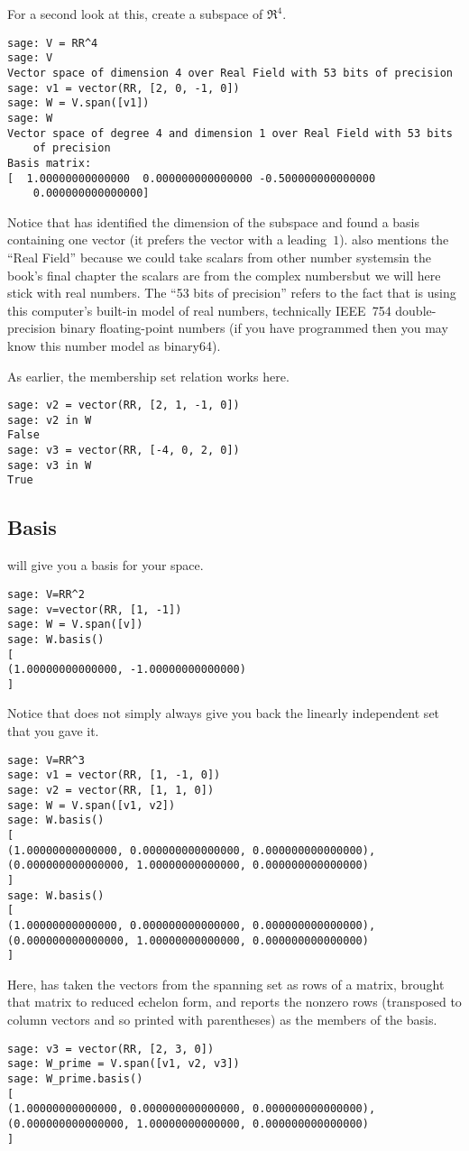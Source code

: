 For a second look at this, create a subspace of $\Re^4$.
\begin{lstlisting}
sage: V = RR^4
sage: V
Vector space of dimension 4 over Real Field with 53 bits of precision
sage: v1 = vector(RR, [2, 0, -1, 0])
sage: W = V.span([v1])
sage: W
Vector space of degree 4 and dimension 1 over Real Field with 53 bits 
    of precision
Basis matrix:
[  1.00000000000000  0.000000000000000 -0.500000000000000  
    0.000000000000000]
\end{lstlisting}
Notice that \Sage{} has identified the dimension of the subspace and found
a basis containing one vector (it prefers the vector with a leading~$1$).
\Sage{} also mentions the ``Real Field'' because we could take scalars
from other number systems\Dash in the book's final chapter the scalars are
from the complex numbers\Dash but we will here stick with real numbers.
The ``53 bits of precision'' refers to the fact that \Sage{} is using
this computer's built-in model of real numbers, technically 
IEEE~754 double-precision binary floating-point numbers 
(if you have programmed then you may know this number model as binary64).  

As earlier, the membership set relation works here.
\begin{lstlisting}
sage: v2 = vector(RR, [2, 1, -1, 0])
sage: v2 in W
False
sage: v3 = vector(RR, [-4, 0, 2, 0])
sage: v3 in W
True  
\end{lstlisting}



\subsection{Basis}
\Sage{} will give you a basis for your space.
\begin{lstlisting}
sage: V=RR^2
sage: v=vector(RR, [1, -1])
sage: W = V.span([v])     
sage: W.basis()
[
(1.00000000000000, -1.00000000000000)
]  
\end{lstlisting}
Notice that \Sage{} does not simply always 
give you back the linearly independent
set that you gave it.
\begin{lstlisting}
sage: V=RR^3               
sage: v1 = vector(RR, [1, -1, 0]) 
sage: v2 = vector(RR, [1, 1, 0]) 
sage: W = V.span([v1, v2])       
sage: W.basis()
[
(1.00000000000000, 0.000000000000000, 0.000000000000000),
(0.000000000000000, 1.00000000000000, 0.000000000000000)
]
sage: W.basis()
[
(1.00000000000000, 0.000000000000000, 0.000000000000000),
(0.000000000000000, 1.00000000000000, 0.000000000000000)
]
\end{lstlisting}
Here, \Sage{} has taken the vectors from the spanning set as rows of a matrix,
brought that matrix to reduced echelon form, and reports the nonzero 
rows (transposed to column vectors and so printed with parentheses) 
as the members of the basis.
\begin{lstlisting}
sage: v3 = vector(RR, [2, 3, 0])
sage: W_prime = V.span([v1, v2, v3])
sage: W_prime.basis()
[
(1.00000000000000, 0.000000000000000, 0.000000000000000),
(0.000000000000000, 1.00000000000000, 0.000000000000000)
]  
\end{lstlisting}

